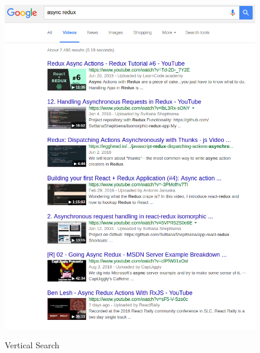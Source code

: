 \documentclass[11pt]{article}
\begin{document}
\begin{figure}[h]
	\centering
	{\includegraphics[scale=0.5]{googleVerticalSearch.png}}
	\caption{Vertical Search}
	\label{fig:vsearch}
\end{figure}
\end{document}
